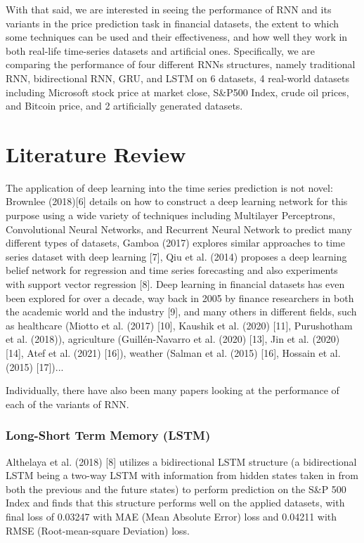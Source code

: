 \documentclass[letterpaper, 10 pt, conference]{ieeeconf}  %
\begin{document}
    With that said, we are interested in seeing the performance of RNN and its variants in the price prediction task in financial datasets, the extent to which some techniques can be used and their effectiveness, and how well they work in both real-life time-series datasets and artificial ones. Specifically, we are comparing the performance of four different RNNs structures, namely traditional RNN, bidirectional RNN, GRU, and LSTM on 6 datasets, 4 real-world datasets including Microsoft stock price at market close, S\&P500 Index, crude oil prices, and Bitcoin price, and 2 artificially generated datasets.

\section{Literature Review}
    The application of deep learning into the time series prediction is not novel: Brownlee (2018)[6] details on how to construct a deep learning network for this purpose using a wide variety of techniques including Multilayer Perceptrons, Convolutional Neural Networks, and Recurrent Neural Network to predict many different types of datasets, Gamboa (2017) explores similar approaches to time series dataset with deep learning [7], Qiu et al. (2014) proposes a deep learning belief network for regression and time series forecasting and also experiments with support vector regression [8]. Deep learning in financial datasets has even been explored for over a decade, way back in 2005 by finance researchers in both the academic world and the industry [9], and many others in different fields, such as healthcare (Miotto et al. (2017) [10], Kaushik et al. (2020) [11], Purushotham et al. (2018)), agriculture (Guillén-Navarro et al. (2020) [13], Jin et al. (2020) [14], Atef et al. (2021) [16]), weather (Salman et al. (2015) [16], Hossain et al. (2015) [17])...

    Individually, there have also been many papers looking at the performance of each of the variants of RNN.
    \subsubsection{Long-Short Term Memory (LSTM)}
        Althelaya et al. (2018) [8] utilizes a bidirectional LSTM structure (a bidirectional LSTM being a two-way LSTM with information from hidden states taken in from both the previous and the future states) to perform prediction on the S\&P 500 Index and finds that this structure performs well on the applied datasets, with final loss of 0.03247 with MAE (Mean Absolute Error) loss and 0.04211 with RMSE (Root-mean-square Deviation) loss. 
\end{document}
